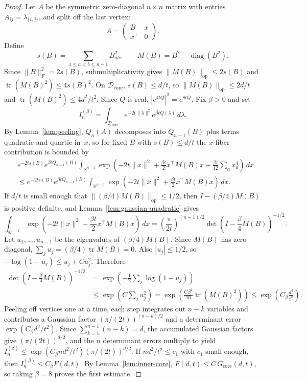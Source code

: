 \documentclass[11pt]{article}
\theoremstyle{definition}
\newcommand{\R}{\mathbb{R}}
\newcommand{\corereg}{\mathcal{D}_\mathrm{core}}
\newcommand{\diag}{\operatorname{diag}}
\newcommand{\core}{G_{\mathrm{core}}}
\begin{document}
\begin{proof}
Let \(A\) be the symmetric zero-diagonal \(n\times n\) matrix with entries \(A_{ij}=\lambda_{\{i,j\}}\), and split off the last vertex:
\[
  A=
  \begin{pmatrix}
    B & x\\
    x^\top & 0
  \end{pmatrix}.
\]
Define
\[
  s(B)=\sum_{1\le a<b\le n-1}B_{ab}^2,
  \qquad
  M(B)=B^2-\diag(B^2).
\]
Since \(\|B\|_F^2=2s(B)\), submultiplicativity gives \(\|M(B)\|_{\mathrm{op}}\le 2s(B)\) and \(\operatorname{tr}(M(B)^2)\le 4s(B)^2\). On \(\corereg\), \(s(B)\le d/t\), so \(\|M(B)\|_{\mathrm{op}}\le 2d/t\) and \(\operatorname{tr}(M(B)^2)\le 4d^2/t^2\).
Since \(Q\) is real, \(|e^{4tQ}|^2=e^{8tQ}\). Fix \(\beta>0\) and set
\[
  I_n^{(\beta)}=\int_{\corereg}e^{-2t\|\lambda\|^2}e^{\beta tQ(\lambda)}\,d\lambda.
\]
By Lemma~\ref{lem:peeling}, \(Q_n(A)\) decomposes into \(Q_{n-1}(B)\) plus terms quadratic and quartic in~\(x\), so for fixed \(B\) with \(s(B)\le d/t\) the \(x\)-fiber contribution is bounded by
\begin{align*}
  &e^{-2ts(B)}e^{\beta tQ_{n-1}(B)}
  \int_{\R^{n-1}}
    \exp\!\left(
      -2t\|x\|^2+\frac{\beta t}{2}x^\top M(B)x-\frac{\beta t}{12}\sum_a x_a^4
    \right)\,dx\\
  &\le
  e^{-2ts(B)}e^{\beta tQ_{n-1}(B)}
  \int_{\R^{n-1}}
    \exp\!\left(
      -2t\|x\|^2+\frac{\beta t}{2}x^\top M(B)x
    \right)\,dx.
\end{align*}
If \(d/t\) is small enough that \(\|(\beta/4)M(B)\|_{\mathrm{op}}\le 1/2\), then \(I-(\beta/4)M(B)\) is positive definite, and Lemma~\ref{lem:gaussian-quadratic} gives
\[
  \int_{\R^{n-1}}
  \exp\!\left(
    -2t\|x\|^2+\frac{\beta t}{2}x^\top M(B)x
  \right)\,dx
  =
  \left(\frac{\pi}{2t}\right)^{(n-1)/2}
  \det\!\left(I-\frac{\beta}{4}M(B)\right)^{-1/2}.
\]
Let \(u_1,\dots,u_{n-1}\) be the eigenvalues of \((\beta/4)M(B)\). Since \(M(B)\) has zero diagonal, \(\sum_j u_j=(\beta/4)\operatorname{tr}M(B)=0\). Also \(|u_j|\le 1/2\), so \(-\log(1-u_j)\le u_j+Cu_j^2\). Therefore
\begin{align*}
  \det\!\left(I-\frac{\beta}{4}M(B)\right)^{-1/2}
  &=\exp\!\left(-\frac12\sum_j\log(1-u_j)\right)\\
  &\le \exp\!\left(C\sum_j u_j^2\right)
   = \exp\!\left(\frac{C\beta^2}{16}\operatorname{tr}(M(B)^2)\right)
  \le \exp\!\left(C_\beta\frac{d^2}{t^2}\right).
\end{align*}
Peeling off vertices one at a time, each step integrates out \(n{-}k\) variables and contributes a Gaussian factor \((\pi/(2t))^{(n-k)/2}\) and a determinant error \(\exp(C_\beta d^2/t^2)\). Since \(\sum_{k=1}^{n-1}(n{-}k)=d\), the accumulated Gaussian factors give \((\pi/(2t))^{d/2}\), and the \(n\) determinant errors multiply to yield \(I_n^{(\beta)}\le \exp(C_\beta nd^2/t^2)(\pi/(2t))^{d/2}\).
If \(nd^2/t^2\le c_1\) with \(c_1\) small enough, then \(I_n^{(\beta)}\le C_\beta F(d,t)\).
By Lemma~\ref{lem:inner-core}, \(F(d,t)\le C\,\core(d,t)\), so taking \(\beta=8\) proves the first estimate.


\end{proof}
\end{document}
